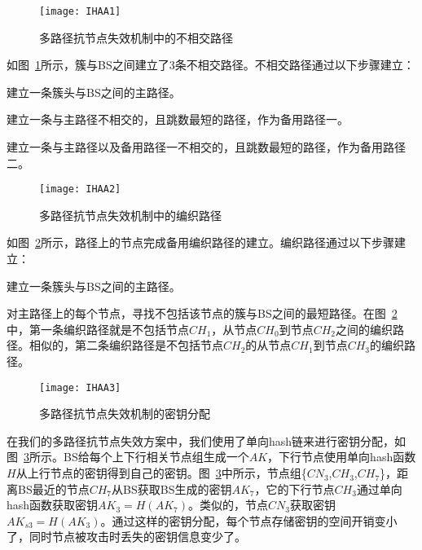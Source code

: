 \begin{figure}[htbp]
  \centering
  \texttt{[image: IHAA1]}
  \caption{多路径抗节点失效机制中的不相交路径}
  \label{fig:IHAA1}
\end{figure}
如图~\ref{fig:IHAA1}所示，簇与BS之间建立了3条不相交路径。不相交路径通过以下步骤建立：
\begin{compactitem}
  \item 建立一条簇头与BS之间的主路径。
  \item 建立一条与主路径不相交的，且跳数最短的路径，作为备用路径一。
  \item 建立一条与主路径以及备用路径一不相交的，且跳数最短的路径，作为备用路径二。
\end{compactitem}

\begin{figure}[htbp]
  \centering
  \texttt{[image: IHAA2]}
  \caption{多路径抗节点失效机制中的编织路径}
  \label{fig:IHAA2}
\end{figure}
如图~\ref{fig:IHAA2}所示，路径上的节点完成备用编织路径的建立。编织路径通过以下步骤建立：
\begin{compactitem}
  \item 建立一条簇头与BS之间的主路径。
  \item 对主路径上的每个节点，寻找不包括该节点的簇与BS之间的最短路径。在图~\ref{fig:IHAA2} 中，第一条编织路径就是不包括节点$CH_1$，从节点$CH_0$到节点$CH_2$之间的编织路径。相似的，第二条编织路径是不包括节点$CH_2$的从节点$CH_1$到节点$CH_3$的编织路径。
\end{compactitem}

\begin{figure}[htbp]
  \centering
  \texttt{[image: IHAA3]}
  \caption{多路径抗节点失效机制的密钥分配}
  \label{fig:IHAA3}
\end{figure}
在我们的多路径抗节点失效方案中，我们使用了单向hash链来进行密钥分配，如图~\ref{fig:IHAA3}所示。BS给每个上下行相关节点组生成一个$AK$，下行节点使用单向hash函数$H$从上行节点的密钥得到自己的密钥。图~\ref{fig:IHAA3}中所示，节点组\{$CN_3$,$CH_3$,$CH_7$\}，距离BS最近的节点$CH_7$从BS获取BS生成的密钥$AK_7$，它的下行节点$CH_3$通过单向hash函数获取密钥$AK_3=H(AK_7)$。类似的，节点$CN_3$获取密钥$AK_{s3}=H(AK_3)$。通过这样的密钥分配，每个节点存储密钥的空间开销变小了，同时节点被攻击时丢失的密钥信息变少了。
